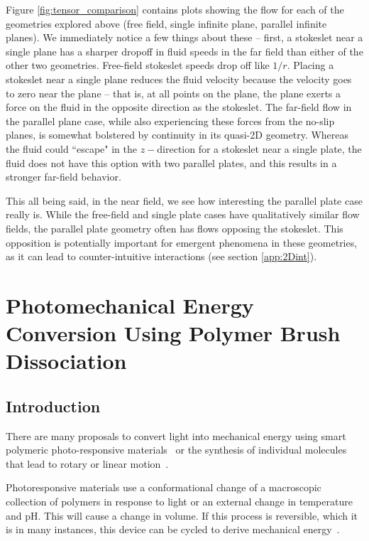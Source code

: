 \documentclass[11pt]{ucthesis}
\begin{document}
Figure \ref{fig:tensor_comparison} contains plots showing the flow for each of the geometries explored above (free field, single infinite plane, parallel infinite planes). We immediately notice a few things about these -- first, a stokeslet near a single plane has a sharper dropoff in fluid speeds in the far field than either of the other two geometries. Free-field stokeslet speeds drop off like $1/r$. Placing a stokeslet near a single plane reduces the fluid velocity because the velocity goes to zero near the plane -- that is, at all points on the plane, the plane exerts a force on the fluid in the opposite direction as the stokeslet. The far-field flow in the parallel plane case, while also experiencing these forces from the no-slip planes, is somewhat bolstered by continuity in its quasi-2D geometry. Whereas the fluid could ``escape" in the $z-$direction for a stokeslet near a single plate, the fluid does not have this option with two parallel plates, and this results in a stronger far-field behavior.

This all being said, in the near field, we see how interesting the parallel plate case really is. While the free-field and single plate cases have qualitatively similar flow fields, the parallel plate geometry often has flows opposing the stokeslet. This opposition is potentially important for emergent phenomena in these geometries, as it can lead to counter-intuitive interactions (see section \ref{app:2Dint}).

\chapter{Photomechanical Energy Conversion Using Polymer Brush Dissociation}
\label{chap:photomechanical}

\section{Introduction}
\label{sec:Introduction}

There are many proposals to convert light into mechanical energy using smart
polymeric photo-responsive materials~\cite{IrieKunwatchakun,Irie,SuzukiHirasa,BehlLendlein,RoyGupta}
or the synthesis of individual molecules that lead to rotary or linear motion~\cite{credi2006}.  

Photoresponsive materials
use a conformational change of a macroscopic collection of polymers in response
to light or an external change in temperature and pH. This will cause a change
in volume. If this process is reversible, which it is in many instances, this
device can be cycled to derive mechanical energy~\cite{IrieKunwatchakun,Irie,SuzukiHirasa}. 
\end{document}
